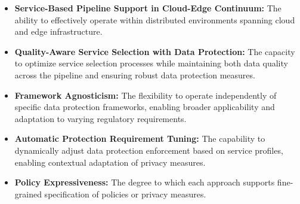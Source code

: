 \begin{itemize}
    \item \textbf{Service-Based Pipeline Support in Cloud-Edge Continuum:} The ability to effectively operate within distributed environments spanning cloud and edge infrastructure.
    \item \textbf{Quality-Aware Service Selection with Data Protection:} The capacity to optimize service selection processes while maintaining both data quality across the pipeline and ensuring robust data protection measures.

    \item \textbf{Framework Agnosticism:} The flexibility to operate independently of specific data protection frameworks, enabling broader applicability and adaptation to varying regulatory requirements.

    \item \textbf{Automatic Protection Requirement Tuning:} The capability to dynamically adjust data protection enforcement based on service profiles, enabling contextual adaptation of privacy measures.

    \item \textbf{Policy Expressiveness:} The degree to which each approach supports fine-grained specification of policies or privacy measures.
\end{itemize}

